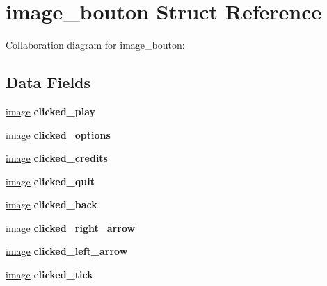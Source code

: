 \hypertarget{structimage__bouton}{}\section{image\+\_\+bouton Struct Reference}
\label{structimage__bouton}


Collaboration diagram for image\+\_\+bouton\+:
\subsection*{Data Fields}
\begin{DoxyCompactItemize}
\item 
\mbox{\label{structimage__bouton_a16e5ebe5c0557b0108fe40c38daed35d}} 
\hyperlink{structimage}{image} {\bfseries clicked\+\_\+play}
\item 
\mbox{\label{structimage__bouton_a6f63552108aa16feca8fbd99ffd59fd6}} 
\hyperlink{structimage}{image} {\bfseries clicked\+\_\+options}
\item 
\mbox{\label{structimage__bouton_a534a6c159a15fb97ff0f6eab415d9848}} 
\hyperlink{structimage}{image} {\bfseries clicked\+\_\+credits}
\item 
\mbox{\label{structimage__bouton_a8d3e20df06df0e7e27324f58b4e15692}} 
\hyperlink{structimage}{image} {\bfseries clicked\+\_\+quit}
\item 
\mbox{\label{structimage__bouton_a4374b04b52a6bb5613b30eeeda624d79}} 
\hyperlink{structimage}{image} {\bfseries clicked\+\_\+back}
\item 
\mbox{\label{structimage__bouton_aa9bfba83cb3c20ce2dbb775f2c666af9}} 
\hyperlink{structimage}{image} {\bfseries clicked\+\_\+right\+\_\+arrow}
\item 
\mbox{\label{structimage__bouton_ac7e4ceee1fa427d4ac3fd47bbdfc331b}} 
\hyperlink{structimage}{image} {\bfseries clicked\+\_\+left\+\_\+arrow}
\item 
\mbox{\label{structimage__bouton_a89296adcff6ee03a413b75f19e2c831f}} 
\hyperlink{structimage}{image} {\bfseries clicked\+\_\+tick}

\end{DoxyCompactItemize}
